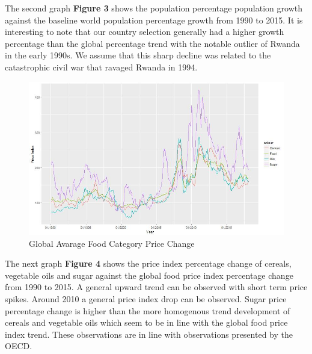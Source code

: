\documentclass[11pt]{article}
\begin{document}
The second graph \textbf{Figure 3} shows the population percentage population growth against the baseline world population percentage growth from 1990 to 2015. It is interesting to note that our country selection generally had a higher growth percentage than the global percentage trend with the notable outlier of Rwanda in the early 1990s. We assume that this sharp decline was related to the catastrophic civil war that ravaged Rwanda in 1994. 

\FloatBarrier
\begin{figure}[!htb]
\begin{center}
\includegraphics[scale=0.65]{price_index.jpg}
\caption{Global Avarage Food Category Price Change}
\label{figure4}
\end{center}
\end{figure}
\FloatBarrier

The next graph \textbf{Figure 4} shows the price index percentage change of cereals, vegetable oils and sugar against the global food price index percentage change from 1990 to 2015. A general upward trend can be observed with short term price spikes. Around 2010 a general price index drop can be observed. Sugar price percentage change is higher than the more homogenous trend development of cereals and vegetable oils which seem to be in line with the global food price index trend. These observations are in line with observations presented by the OECD. 
\end{document}
